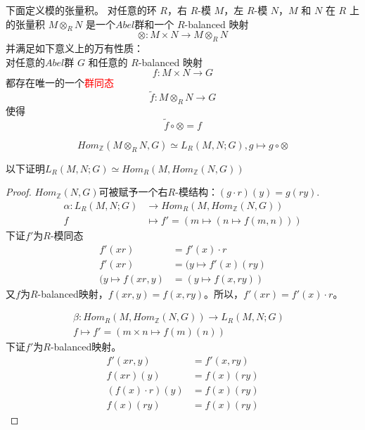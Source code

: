 \documentclass{ctexart}
\begin{document}
\begin{enumerate}
下面定义模的张量积。
对任意的环 $R$，右 $R$-模 $M$，左 $R$-模 $N$，$M$ 和 $N$ 在 $R$ 上的张量积 $M \otimes_R N$ 是一个$Abel$群和一个 $R$-balanced 映射
\[
\otimes : M \times N \to M \otimes_R N
\]
并满足如下意义上的万有性质：\\
对任意的$Abel$群 $G$ 和任意的 $R$-balanced 映射
\[
f : M \times N \to G
\]
都存在唯一的一个\textcolor{red}{群同态}
\[
\tilde{f} : M \otimes_R N \to G
\]
使得
\[
\tilde{f} \circ \otimes = f
\]

\begin{center}
\end{center}

\[
Hom_\mathbb{Z}(M \otimes_R N,G) \simeq L_R(M,N;G),g \mapsto g \circ \otimes
\]

以下证明$L_R(M,N;G) \simeq Hom_R(M,Hom_\mathbb{Z}(N,G))$
\begin{proof}
$Hom_\mathbb{Z}(N,G)$可被赋予一个右$R$-模结构：$(g \cdot r)(y) = g(ry)$.\\
\begin{align*}
\alpha : L_R(M,N;G) &\to Hom_R(M,Hom_\mathbb{Z}(N,G))\\
f &\mapsto f' = (m \mapsto (n \mapsto f(m,n)))
\end{align*}
下证$f'$为$R$-模同态
\begin{align*}
f'(xr) &= f'(x) \cdot r\\
f'(xr) &= (y \mapsto f'(x)(ry)\\
(y \mapsto f(xr,y) &= (y \mapsto f(x,ry))
\end{align*}
又$f$为$R$-balanced映射，$f(xr,y) = f(x,ry)$。所以，$f'(xr) = f'(x) \cdot r$。

\begin{align*}
\beta : Hom_R(M,Hom_\mathbb{Z}(N,G)) \to L_R(M,N;G)&\\
f \mapsto f' = (m \times n \mapsto f(m)(n))&
\end{align*}
下证$f'$为$R$-balanced映射。
\begin{align*}
f'(xr,y) &= f'(x,ry)\\
f(xr)(y) &= f(x)(ry)\\
(f(x) \cdot r)(y) &= f(x)(ry)\\
f(x)(ry) &= f(x)(ry)
\end{align*}


\end{proof}
\end{enumerate}
\end{document}
